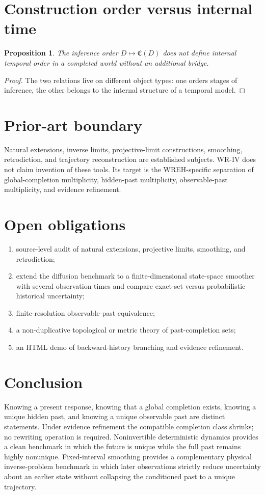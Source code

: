 \documentclass[11pt]{article}
\newtheorem{proposition}[definition]{Proposition}
\newcommand{\Ccal}{\mathfrak C}
\begin{document}
\section{Construction order versus internal time}
\begin{proposition}
The inference order $D\mapsto\Ccal(D)$ does not define internal temporal order in a completed world without an additional bridge.
\end{proposition}
\begin{proof}
The two relations live on different object types: one orders stages of inference, the other belongs to the internal structure of a temporal model.
\end{proof}

\section{Prior-art boundary}
Natural extensions, inverse limits, projective-limit constructions, smoothing, retrodiction, and trajectory reconstruction are established subjects. WR-IV does not claim invention of these tools. Its target is the WREH-specific separation of global-completion multiplicity, hidden-past multiplicity, observable-past multiplicity, and evidence refinement.

\section{Open obligations}
\begin{enumerate}
\item source-level audit of natural extensions, projective limits, smoothing, and retrodiction;
\item extend the diffusion benchmark to a finite-dimensional state-space smoother with several observation times and compare exact-set versus probabilistic historical uncertainty;
\item finite-resolution observable-past equivalence;
\item a non-duplicative topological or metric theory of past-completion sets;
\item an HTML demo of backward-history branching and evidence refinement.
\end{enumerate}

\section*{Conclusion}
Knowing a present response, knowing that a global completion exists, knowing a unique hidden past, and knowing a unique observable past are distinct statements. Under evidence refinement the compatible completion class shrinks; no rewriting operation is required. Noninvertible deterministic dynamics provides a clean benchmark in which the future is unique while the full past remains highly nonunique. Fixed-interval smoothing provides a complementary physical inverse-problem benchmark in which later observations strictly reduce uncertainty about an earlier state without collapsing the conditioned past to a unique trajectory.
\end{document}
